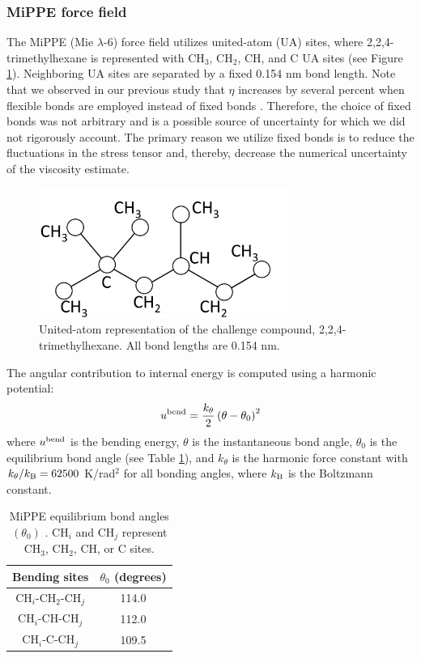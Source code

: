 \documentclass[preprint,review,12pt]{elsarticle}
\begin{document}
    \subsubsection{MiPPE force field}
	
	The MiPPE (Mie $\lambda$-6) force field utilizes united-atom (UA) sites, where 2,2,4-trimethylhexane is represented with CH$_3$, CH$_2$, CH, and C UA sites (see Figure \ref{fig:224TMH}). Neighboring UA sites are separated by a fixed 0.154 nm bond length. Note that we observed in our previous study that $\eta$ increases by several percent when flexible bonds are employed instead of fixed bonds \cite{Postdoc_3}. Therefore, the choice of fixed bonds was not arbitrary and is a possible source of uncertainty for which we did not rigorously account. The primary reason we utilize fixed bonds is to reduce the fluctuations in the stress tensor and, thereby, decrease the numerical uncertainty of the viscosity estimate.
	
	\begin{figure}[htb!]
		\centering
		\includegraphics[width=3.2in]{UA_IFPSC10}
		\caption{United-atom representation of the challenge compound, 2,2,4-trimethylhexane. All bond lengths are 0.154 nm.} 
		\label{fig:224TMH}
	\end{figure}
	
	The angular contribution to internal energy is computed using a harmonic potential:
	\begin{equation}
	u^{\rm bend} = \frac{k_\theta}{2} \left(\theta-\theta_0\right)^2
	\end{equation}
	where $u^{\rm bend}$ is the bending energy, $\theta$ is the instantaneous bond angle, $\theta_0$ is the equilibrium bond angle (see Table \ref{tab:angles}), and $k_\theta$ is the harmonic force constant with $k_\theta/k_{\rm B} = 62500$ K/rad$^2$ for all bonding angles, where $k_{\rm B}$ is the Boltzmann constant. 
	
	\begin{table}[h!]
		\caption{MiPPE equilibrium bond angles $(\theta_0)$ \cite{Martin1999,Potoff_branched}. CH$_i$ and CH$_j$ represent CH$_3$, CH$_2$, CH, or C sites.} \label{tab:angles}
		\begin{center}
			\begin{tabular}{|c|c|}
				\hline
				Bending sites & $\theta_0$ (degrees) \\ \hline
				CH$_i$-CH$_2$-CH$_j$ & 114.0 \\ 
				CH$_i$-CH-CH$_j$ & 112.0 \\ 
				CH$_i$-C-CH$_j$ & 109.5 \\  
				\hline
			\end{tabular}
		\end{center} 
	\end{table}
	
\end{document}
